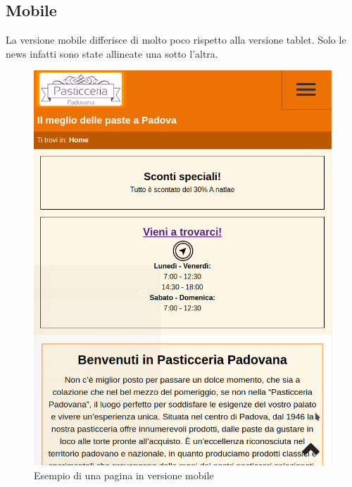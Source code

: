 \subsection{Mobile}
La versione mobile differisce di molto poco rispetto alla versione tablet. Solo le news infatti sono state allineate una sotto l'altra.
\begin{figure}[!h]
    \centering		  
	\includegraphics[width=1\linewidth]{sezioni/Progettazione/Immagini/mobile_example.png}
	\caption{Esempio di una pagina in versione mobile}
	\label{Fig:verMobile}
\end{figure}